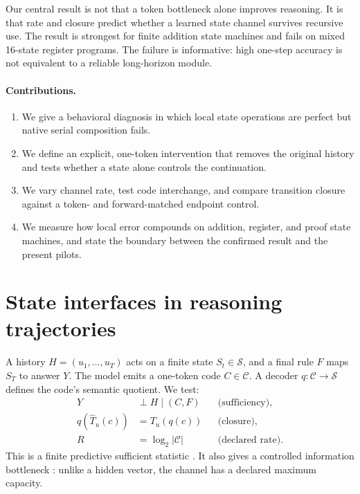 \documentclass[10pt]{article}
\newcommand{\state}{S}
\newcommand{\code}{C}
\begin{document}
Our central result is not that a token bottleneck alone improves reasoning.
It is that rate and closure predict whether a learned state channel survives
recursive use. The result is strongest for finite addition state machines and
fails on mixed 16-state register programs. The failure is informative: high
one-step accuracy is not equivalent to a reliable long-horizon module.

\paragraph{Contributions.}
\begin{enumerate}
  \item We give a behavioral diagnosis in which local state operations are
  perfect but native serial composition fails.
  \item We define an explicit, one-token intervention that removes the original
  history and tests whether a state alone controls the continuation.
  \item We vary channel rate, test code interchange, and compare transition
  closure against a token- and forward-matched endpoint control.
  \item We measure how local error compounds on addition, register, and proof
  state machines, and state the boundary between the confirmed result and the
  present pilots.
\end{enumerate}

\section{State interfaces in reasoning trajectories}

A history $H=(u_1,\ldots,u_T)$ acts on a finite state
$\state_t\in\mathcal S$, and a final rule $F$ maps $\state_T$ to answer $Y$.
The model emits a one-token code $\code\in\mathcal C$. A decoder
$q:\mathcal C\rightarrow\mathcal S$ defines the code's semantic quotient.
We test:
\begin{align}
Y &\perp H \mid (\code,F) && \text{(sufficiency)},\\
q(\widehat T_u(c)) &= T_u(q(c)) && \text{(closure)},\\
R &= \log_2|\mathcal C| && \text{(declared rate)}.
\end{align}
This is a finite predictive sufficient statistic
\citep{shalizi2001computational}. It also gives a controlled information
bottleneck \citep{shannon1948mathematical,tishby2000information}: unlike a
hidden vector, the channel has a declared maximum capacity.
\end{document}
